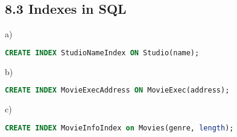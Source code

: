 \documentclass[../../main.tex]{subfiles}
\begin{document}
\subsection*{8.3 Indexes in SQL}

a)

\begin{lstlisting}[language=sql]
  CREATE INDEX StudioNameIndex ON Studio(name);
\end{lstlisting}

b)

\begin{lstlisting}[language=sql]
  CREATE INDEX MovieExecAddress ON MovieExec(address);
\end{lstlisting}

c)

\begin{lstlisting}[language=sql]
  CREATE INDEX MovieInfoIndex on Movies(genre, length);
\end{lstlisting}
\end{document}
